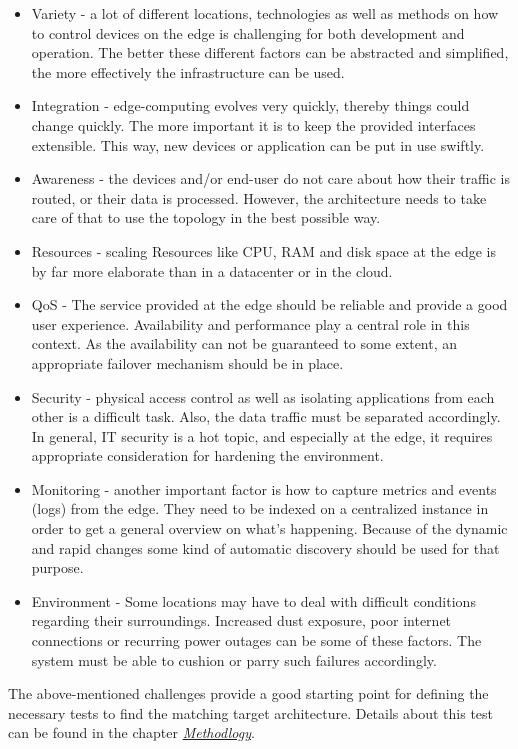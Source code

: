 \documentclass[MSC,Master,english]{twbook}%
\begin{document}
\begin{itemize}
    \item Variety - a lot of different locations, technologies as well as methods on how to control devices on the edge is challenging for both development and operation. The better these different factors can be abstracted and simplified, the more effectively the infrastructure can be used.
    \item Integration - edge-computing evolves very quickly, thereby things could change quickly. The more important it is to keep the provided interfaces extensible. This way, new devices or application can be put in use swiftly. 
    \item Awareness - the devices and/or end-user do not care about how their traffic is routed, or their data is processed. However, the architecture needs to take care of that to use the topology in the best possible way.
    \item Resources - scaling Resources like \ac{CPU}, \ac{RAM} and disk space at the edge is by far more elaborate than in a datacenter or in the cloud.
    \item \ac{QoS} - The service provided at the edge should be reliable and provide a good user experience. Availability and performance play a central role in this context. As the availability can not be guaranteed to some extent, an appropriate failover mechanism should be in place.
    \item Security - physical access control as well as isolating applications from each other is a difficult task. Also, the data traffic must be separated accordingly. In general, \ac{IT} security is a hot topic, and especially at the edge, it requires appropriate consideration for hardening the environment.
    \item Monitoring - another important factor is how to capture metrics and events (logs) from the edge. They need to be indexed on a centralized instance in order to get a general overview on what's happening. Because of the dynamic and rapid changes some kind of automatic discovery should be used for that purpose.
    \item Environment - Some locations may have to deal with difficult conditions regarding their surroundings. Increased dust exposure, poor internet connections or recurring power outages can be some of these factors. The system must be able to cushion or parry such failures accordingly.
\end{itemize}
The above-mentioned challenges provide a good starting point for defining the necessary tests to find the matching target architecture. Details about this test can be found in the chapter \textit{\hyperref[sec:dsrmethode]{Methodlogy}}.
\end{document}
